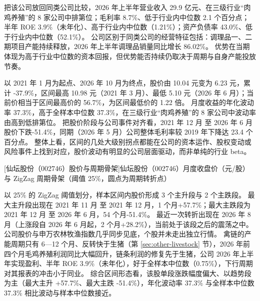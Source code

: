  把该公司放回同类公司比较，2026 年上半年营业收入 29.9 亿元、在三级行业“肉鸡养殖”的 8 家公司中排第位；毛利率 8.7\%、低于行业内中位数 2.1 个百分点；半年 ROE 3.9\%（未年化）、高于行业内中位数（1.21\%）；资产负债率 43.0\%、低于行业内中位数（52.1\%）。 公司区别于同类公司的经营特征包括：调理品一、二期项目产能持续释放，2026 年上半年调理品销量同比增长 86.02\%。 优势在当期体现为高于行业中位数的资本回报，但优势能否持续仍取决于周期与自身产能投放节奏。

 以 2021 年 1 月为起点、2026 年 10 月为终点，股价由 10.04 元变为 6.23 元，累计 -37.9\%，区间最高 10.98 元（2021 年 3 月）、最低 5.10 元（2026 年 6 月）；当前价相当于区间最高价的 56.7\%，为区间最低价的 1.22 倍。 月度收益的年化波动率 37.3\%，高于全样本中位数 37.3\%，在三级行业“肉鸡养殖”的 8 家公司中波动率由高到低排第位。 把股价阶段与公司事件对齐看，2021 年 12 月 至 2026 年 6 月股价下跌-51.4\%，同期（2026 年 5 月）公司整体毛利率较 2019 年下降达 23.4 个百分点。 整体上看，区间的几处大级别拐点都能在公司的资本运作、股权变动或风险事件上找到对应，股价波动有明显的公司层面驱动，而非单纯的行业 beta。

\begin{center}
\begin{minipage}{\textwidth}\centering
{}

[仙坛股份（002746）股价与周期骨架]{仙坛股份（002746）月度收盘价（元/股）与 ZigZag 周期骨架（阈值 25\%，圆点为周期转折点）}
\end{minipage}
\end{center}

 以 25\% 的 ZigZag 阈值划分，样本区间内股价形成 3 个主升段与 2 个主跌段。 最大主升段出现在 2021 年 11 月 至 2021 年 12 月，1 个月+57.7\%；最大主跌段为 2021 年 12 月 至 2026 年 6 月，54 个月-51.4\%。 最近一次转折出现在 2026 年 8 月（上涨段自 2026 年 6 月起，2 个月+28.2\%），当前处于该段之后的震荡之中。 公司股价与申万农林牧渔指数几乎同步见底，个股并未走出独立行情。 禽链的产能周期只有 6---12 个月、反转快于生猪（第 \ref{sec:other-livestock} 节），2026 年前四个月毛鸡养殖利润同比大幅回升，链条利润的修复先于生猪，公司 2026 年上半年实现盈利、半年 ROE 3.9\%（未年化），好于全样本中位数（0.75\%），下行周期对其报表的冲击小于同业。 综合区间形态看，该股单段涨跌幅度偏大、以趋势段为主（最大主升 +57.7\%、最大主跌 -51.4\%），年化波动率 37.3\% 与全样本中位数 37.3\% 相比波动与样本中位数接近。

